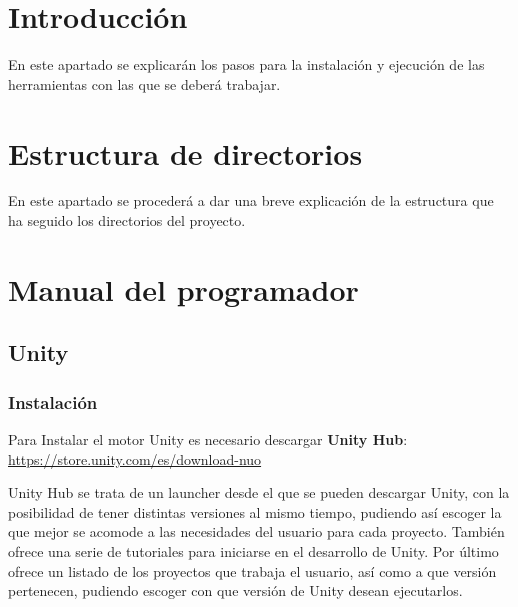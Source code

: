 
\section{Introducción}
En este apartado se explicarán los pasos para la instalación y ejecución de las herramientas con las que se deberá trabajar.
\section{Estructura de directorios}
En este apartado se procederá a dar una breve explicación de la estructura que ha seguido los directorios del proyecto.\\




\section{Manual del programador}

\subsection{Unity}\label{sub:Unity}

\subsubsection{Instalación}

Para Instalar el motor Unity es necesario descargar \textbf{Unity Hub}:\\ \url{https://store.unity.com/es/download-nuo}

Unity Hub se trata de un launcher desde el que se pueden descargar Unity, con la posibilidad de tener distintas versiones al mismo tiempo, pudiendo así escoger la que mejor se acomode a las necesidades del usuario para cada proyecto. También ofrece una serie de tutoriales para iniciarse en el desarrollo de Unity. Por último ofrece un listado de los proyectos que trabaja el usuario, así como a que versión pertenecen, pudiendo escoger con que versión de Unity desean ejecutarlos.

